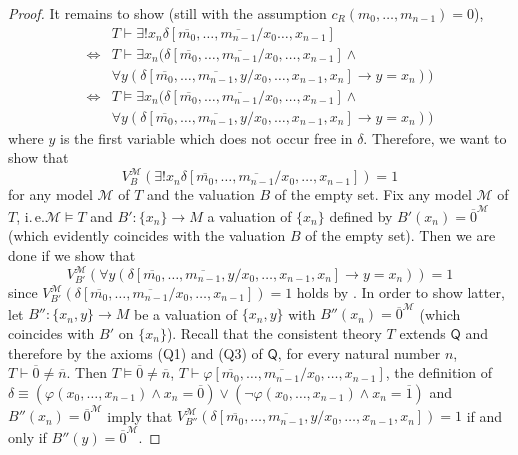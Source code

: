 \begin{proof}
It remains to show (still with the assumption $c_R(m_0, \ldots, m_{n-1}) = 0$), 
\begin{align*}
&T \vdash \exists ! x_n  \delta[\overline{m_0}, \ldots, \overline{m_{n-1}}/ x_0 \ldots, x_{n-1}] \\
 \Leftrightarrow & T \vdash  \exists x_n ( \delta[\overline{m_0}, \ldots, \overline{m_{n-1}}/x_0, \ldots, x_{n-1}] \wedge \\
 & \forall y (\delta[\overline{m_0}, \ldots, \overline{m_{n-1}},y/x_0, \ldots, x_{n-1}, x_n] \rightarrow y = x_n)) \\
 \Leftrightarrow & T \vDash  \exists x_n ( \delta[\overline{m_0}, \ldots, \overline{m_{n-1}}/x_0, \ldots, x_{n-1}] \wedge \\
 & \forall y (\delta[\overline{m_0}, \ldots, \overline{m_{n-1}},y/x_0, \ldots, x_{n-1}, x_n] \rightarrow y = x_n)) 
\end{align*}
where $y$ is the first variable which does not occur free in $\delta$.
Therefore, we want to show that \[V_B^\mathcal{M}(\exists ! x_n  \delta[\overline{m_0}, \ldots, \overline{m_{n-1}}/x_0, \ldots, x_{n-1}]) = 1\] for any model $\mathcal{M}$ of $T$ and the valuation $B$ of the empty set. Fix any model $\mathcal{M}$ of $T$, i.\,e.\@ $\mathcal{M} \vDash T$ and $B': \lbrace x_n \rbrace \rightarrow M$ a valuation of $\lbrace x_n \rbrace$ defined by $B'(x_n) = \overline{0}^\mathcal{M}$ (which evidently coincides with the valuation $B$ of the empty set). Then we are done if we show that \[V_{B'}^\mathcal{M}(\forall y (\delta[\overline{m_0}, \ldots, \overline{m_{n-1}},y/x_0, \ldots, x_{n-1}, x_n] \rightarrow y = x_n))=1\] since $V_{B'}^\mathcal{M}(\delta[\overline{m_0}, \ldots, \overline{m_{n-1}}/x_0, \ldots, x_{n-1}]) =1 $ holds by . In order to show latter, let $B'': \lbrace x_n, y \rbrace \rightarrow M $ be a valuation of $\lbrace x_n, y \rbrace$ with $B''(x_n) =\overline{0}^\mathcal{M}$ (which coincides with $B'$ on $\lbrace x_n \rbrace$). Recall that the consistent theory $T$ extends $\mathsf{Q}$ and therefore by the axioms (Q1) and (Q3) of $\mathsf{Q}$, for every natural number $n$, $T \vdash \overline{0} \neq \overline{n}$. Then $T \vDash \overline{0}\neq \overline{n}$, $T \vdash \varphi[\overline{m_0}, \ldots, \overline{m_{n-1}}/x_0, \ldots, x_{n-1}]$, the definition of $\delta \equiv (\varphi(x_0, \ldots, x_{n-1}) \wedge x_{n} = \overline{0} ) \vee  ( \lnot \varphi(x_0, \ldots, x_{n-1}) \wedge x_{n}= \overline{1})$ and $B''(x_n) =\overline{0}^\mathcal{M}$ imply that $V_{B''}^\mathcal{M}(\delta[\overline{m_0}, \ldots, \overline{m_{n-1}},y/x_0, \ldots, x_{n-1}, x_n]) = 1$ if and only if $B''(y) = \overline{0}^\mathcal{M}$. 


\end{proof}
